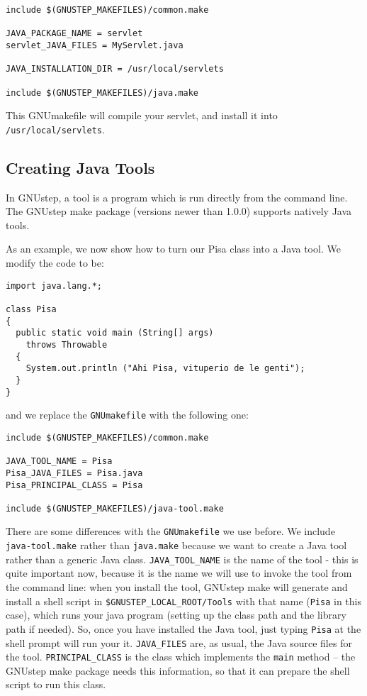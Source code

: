 \begin{verbatim}
include $(GNUSTEP_MAKEFILES)/common.make

JAVA_PACKAGE_NAME = servlet
servlet_JAVA_FILES = MyServlet.java

JAVA_INSTALLATION_DIR = /usr/local/servlets

include $(GNUSTEP_MAKEFILES)/java.make
\end{verbatim}

This GNUmakefile will compile your servlet, and install it into 
\texttt{/usr/local/servlets}.

\subsection{Creating Java Tools}

In GNUstep, a tool is a program which is run directly from the command
line.  The GNUstep make package 
(versions newer than 1.0.0) supports natively Java tools.

As an example, we now show how to turn our Pisa class into a Java
tool.  We modify the code to be:
\begin{verbatim}
import java.lang.*;

class Pisa
{ 
  public static void main (String[] args)
    throws Throwable
  {
    System.out.println ("Ahi Pisa, vituperio de le genti");
  }
}
\end{verbatim}
and we replace the \texttt{GNUmakefile} with the following one:
\begin{verbatim}
include $(GNUSTEP_MAKEFILES)/common.make

JAVA_TOOL_NAME = Pisa
Pisa_JAVA_FILES = Pisa.java
Pisa_PRINCIPAL_CLASS = Pisa

include $(GNUSTEP_MAKEFILES)/java-tool.make
\end{verbatim}
There are some differences with the \texttt{GNUmakefile} we use
before.  We include \texttt{java-tool.make} rather than
\texttt{java.make} because we want to create a Java tool rather than a
generic Java class.
\texttt{JAVA\_TOOL\_NAME} is the name of the tool - this is quite important 
now, because it is the name we will use to invoke the tool from the
command line: when you install the tool, GNUstep make will generate
and install a shell script in \texttt{\$GNUSTEP\_LOCAL\_ROOT/Tools}
with that name (\texttt{Pisa} in this case), which runs your java
program (setting up the class path and the library path if needed).
So, once you have installed the Java tool, just typing \texttt{Pisa}
at the shell prompt will run your it.
\texttt{JAVA\_FILES} are, as usual, the Java source files for the tool.  
\texttt{PRINCIPAL\_CLASS} is the class which implements the \texttt{main} 
method -- the GNUstep make package needs this information, so that it
can prepare the shell script to run this class.

